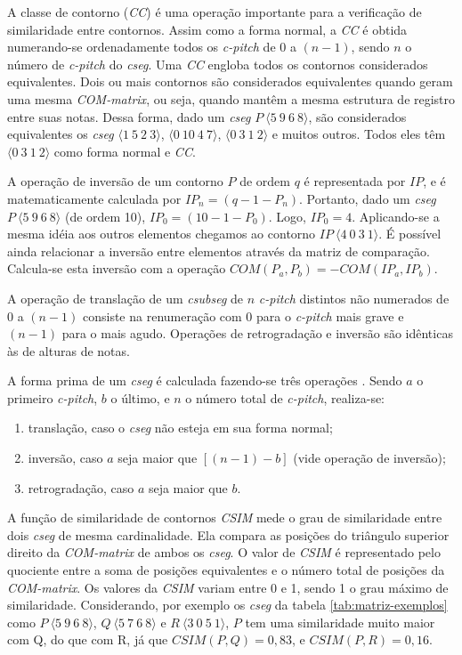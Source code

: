 \documentclass[brazil]{article}
\newcommand{\termo}[1]{\textit{#1}}
\begin{document}
A classe de contorno (\termo{CC}) é uma operação importante para a
verificação de similaridade entre contornos. Assim como a forma
normal, a \termo{CC} é obtida numerando-se ordenadamente todos os
\termo{c-pitch} de $0$ a $(n-1)$, sendo $n$ o número de
\termo{c-pitch} do \termo{cseg}. Uma \termo{CC} engloba todos os
contornos considerados equivalentes. Dois ou mais contornos são
considerados equivalentes quando geram uma mesma \termo{COM-matrix},
ou seja, quando mantêm a mesma estrutura de registro entre suas
notas. Dessa forma, dado um \termo{cseg}
$P\:\langle5\:9\:6\:8\rangle$, são considerados equivalentes os
\termo{cseg} $\langle1\:5\:2\:3\rangle$, $\langle0\:10\:4\:7\rangle$,
$\langle0\:3\:1\:2\rangle$ e muitos outros. Todos eles têm
$\langle0\:3\:1\:2\rangle$ como forma normal e \termo{CC}.

A operação de inversão de um contorno $P$ de ordem $q$ é representada
por $IP$, e é matematicamente calculada por
$IP_n=(q-1-P_n)$. Portanto, dado um \termo{cseg}
$P\:\langle5\:9\:6\:8\rangle$ (de ordem 10), $IP_0=(10-1-P_0)$. Logo,
$IP_0=4$. Aplicando-se a mesma idéia aos outros elementos chegamos ao
contorno $IP\:\langle4\:0\:3\:1\rangle$. É possível ainda relacionar a
inversão entre elementos através da matriz de comparação. Calcula-se
esta inversão com a operação $COM(P_a,P_b)=-COM(IP_a,IP_b)$.

A operação de translação de um \termo{csubseg} de $n$ \termo{c-pitch}
distintos não numerados de $0$ a $(n-1)$ consiste na renumeração com
$0$ para o \termo{c-pitch} mais grave e $(n-1)$ para o mais
agudo. Operações de retrogradação e inversão são idênticas às de
alturas de notas.

A forma prima de um \termo{cseg} é calculada fazendo-se três operações
\cite{marvin.ea87:relating}. Sendo $a$ o primeiro \termo{c-pitch}, $b$
o último, e $n$ o número total de \termo{c-pitch}, realiza-se:
\begin{enumerate}
\item translação, caso o \termo{cseg} não esteja em sua forma normal;
\item inversão, caso $a$ seja maior que $[(n-1) - b]$ (vide operação
  de inversão);
\item retrogradação, caso $a$ seja maior que $b$.
\end{enumerate}

A função de similaridade de contornos \termo{CSIM} mede o grau de
similaridade entre dois \termo{cseg} de mesma cardinalidade. Ela
compara as posições do triângulo superior direito da
\termo{COM-matrix} de ambos os \termo{cseg}. O valor de \termo{CSIM} é
representado pelo quociente entre a soma de posições equivalentes e o
número total de posições da \termo{COM-matrix}. Os valores da
\termo{CSIM} variam entre 0 e 1, sendo 1 o grau máximo de
similaridade. Considerando, por exemplo os \termo{cseg} da tabela
\ref{tab:matriz-exemplos} como $P\:\langle5\:9\:6\:8\rangle$,
$Q\:\langle5\:7\:6\:8\rangle$ e $R\:\langle3\:0\:5\:1\rangle$, $P$ tem
uma similaridade muito maior com Q, do que com R, já que
$CSIM(P,Q)=0,83$, e $CSIM(P,R)=0,16$.
\end{document}
